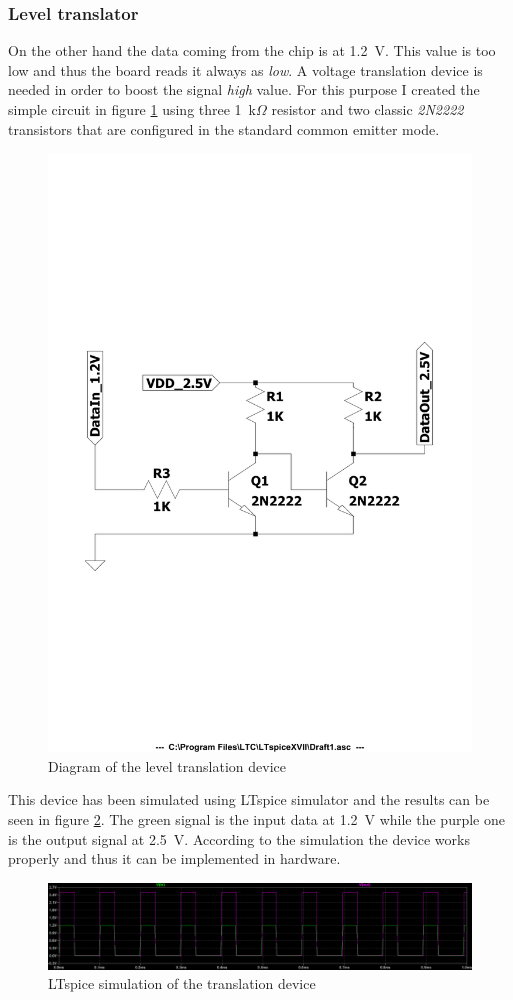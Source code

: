 \subsubsection{Level translator}
On the other hand the data coming from the chip is at 1.2~V. This value is too low and thus the board reads it always as \textit{low}. A voltage translation device is needed in order to boost the signal \textit{high} value. For this purpose I created the simple circuit in figure \ref{fig:diagram} using three 1~k$\Omega$ resistor and two classic \textit{2N2222} transistors that are configured in the standard common emitter mode.
\begin{figure}[H]
	\centering
	\includegraphics[width=0.5\linewidth]{IMG/ch5/DIAGRAM}
	\caption{Diagram of the level translation device}
	\label{fig:diagram}
\end{figure}
\noindent This device has been simulated using LTspice simulator and the results can be seen in figure \ref{fig:transsimulation}. The green signal is the input data at 1.2~V while the purple one is the output signal at 2.5~V.
According to the simulation the device works properly and thus it can be implemented in hardware.
\begin{figure}[H]
	\centering
	\includegraphics[width=1\linewidth]{IMG/ch5/TRANSSIMULATION}
	\caption{LTspice simulation of the translation device}
	\label{fig:transsimulation}
\end{figure}
